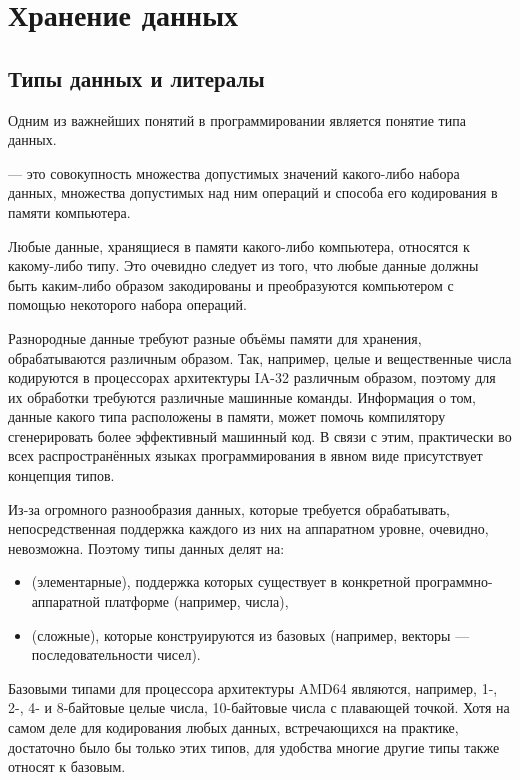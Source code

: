 \chapter{Хранение данных}

\section{Типы данных и литералы}

Одним из важнейших понятий в программировании является понятие типа
данных.

\begin{defn}
   — это совокупность множества
  допустимых значений какого-либо набора данных, множества допустимых
  над ним операций и способа его кодирования в памяти компьютера.
\end{defn}

Любые данные, хранящиеся в памяти какого-либо компьютера, относятся к
какому-либо типу. Это очевидно следует из того, что любые данные
должны быть каким-либо образом закодированы и преобразуются
компьютером с помощью некоторого набора операций.

Разнородные данные требуют разные объёмы памяти для хранения,
обрабатываются различным образом. Так, например, целые и вещественные
числа кодируются в процессорах архитектуры IA-32 различным образом,
поэтому для их обработки требуются различные машинные
команды. Информация о том, данные какого типа расположены в памяти,
может помочь компилятору сгенерировать более эффективный машинный
код. В связи с этим, практически во всех распространённых языках
программирования в явном виде присутствует концепция типов.

Из-за огромного разнообразия данных, которые требуется обрабатывать,
непосредственная поддержка каждого из них на аппаратном уровне,
очевидно, невозможна. Поэтому типы данных делят на:
\begin{itemize}
\item {} (элементарные), поддержка
  которых существует в конкретной программно-аппаратной платформе
  (например, числа),
\item {} (сложные), которые
  конструируются из базовых (например, векторы — последовательности
  чисел).
\end{itemize}

Базовыми типами для процессора архитектуры AMD64 являются, например,
1-, 2-, 4- и 8-байтовые целые числа, 10-байтовые числа с плавающей
точкой. Хотя на самом деле для кодирования любых данных, встречающихся
на практике, достаточно было бы только этих типов, для удобства многие
другие типы также относят к базовым.

